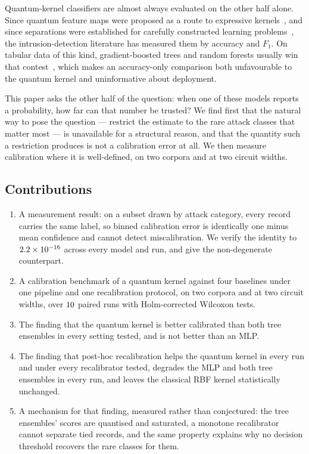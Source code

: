 \documentclass[journal]{IEEEtran}
\begin{document}
Quantum-kernel classifiers are almost always evaluated on the other half
alone. Since quantum feature maps were proposed as a route to expressive
kernels~\cite{havlicek2019,schuld2019hilbert}, and since separations were
established for carefully constructed learning problems~\cite{liu2021speedup},
the intrusion-detection literature has measured them by accuracy and $F_1$.
On tabular data of this kind, gradient-boosted trees and random forests
usually win that contest~\cite{grinsztajn2022tabular}, which makes an
accuracy-only comparison both unfavourable to the quantum kernel and
uninformative about deployment.

This paper asks the other half of the question: when one of these models
reports a probability, how far can that number be trusted? We find first
that the natural way to pose the question --- restrict the estimate to the
rare attack classes that matter most --- is unavailable for a structural
reason, and that the quantity such a restriction produces is not a
calibration error at all. We then measure calibration where it is
well-defined, on two corpora and at two circuit widths.

\subsection*{Contributions}
\begin{enumerate}
  \item A measurement result: on a subset drawn by attack category, every
        record carries the same label, so binned calibration error is
        identically one minus mean confidence and cannot detect
        miscalibration. We verify the identity to $2.2\times10^{-16}$ across
        every model and run, and give the non-degenerate counterpart.
  \item A calibration benchmark of a quantum kernel against four baselines
        under one pipeline and one recalibration protocol, on two corpora and
        at two circuit widths, over $10$ paired runs with
        Holm-corrected Wilcoxon tests.
  \item The finding that the quantum kernel is better calibrated than both
        tree ensembles in every setting tested, and is not better than an
        MLP.
  \item The finding that post-hoc recalibration helps the quantum kernel in
        every run and under every recalibrator tested, degrades the MLP and
        both tree ensembles in every run, and leaves the classical RBF
        kernel statistically unchanged.
  \item A mechanism for that finding, measured rather than conjectured: the
        tree ensembles' scores are quantised and saturated, a monotone
        recalibrator cannot separate tied records, and the same property
        explains why no decision threshold recovers the rare classes for
        them.
\end{enumerate}
\end{document}
